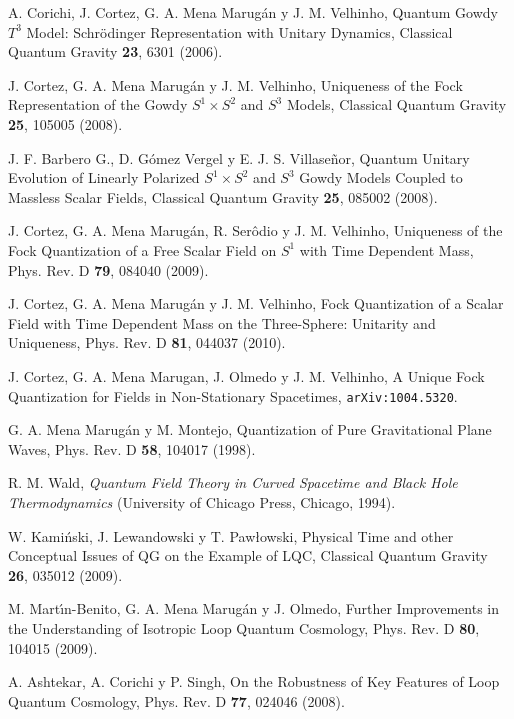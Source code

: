 \begin{thebibliography}{999}
 A. Corichi, J. Cortez, G. A. Mena Marug\'{a}n y J. M. Velhinho, Quantum Gowdy $T^3$
Model: Schr\"odinger Representation with Unitary Dynamics, Classical Quantum Gravity {\bf23}, 6301
(2006).

 J. Cortez, G. A. Mena Marugán y J. M. Velhinho,
Uniqueness of the Fock Representation of the Gowdy $S^1\times S^2$ and $S^3$ Models,
Classical Quantum Gravity {\bf25}, 105005 (2008).

 J. F. Barbero G., D. Gómez Vergel y E. J. S. Villaseñor, Quantum Unitary Evolution
of Linearly Polarized $S^1\times S^2$ and $S^3$ Gowdy Models Coupled to Massless Scalar Fields,
Classical Quantum Gravity {\bf25}, 085002 (2008).

 J. Cortez, G. A. Mena Marugán, R. Serôdio y J. M. Velhinho,
Uniqueness of the Fock Quantization of a Free Scalar Field on $S^1$ with Time Dependent Mass,
Phys. Rev. D {\bf79}, 084040 (2009).

 J. Cortez, G. A. Mena Marugán y J. M. Velhinho,
Fock Quantization of a Scalar Field with Time Dependent Mass on the Three-Sphere: Unitarity and
Uniqueness, Phys. Rev. D {\bf81}, 044037 (2010).

 J. Cortez, G. A. Mena Marugan, J. Olmedo y J. M. Velhinho,
A Unique Fock Quantization for Fields in Non-Stationary Spacetimes, \texttt{arXiv:1004.5320}.


 G. A. Mena Marug\'{a}n y M. Montejo, Quantization of Pure Gravitational Plane
Waves, Phys. Rev. D {\bf58}, 104017 (1998).

 R. M. Wald, {\it Quantum Field Theory in Curved Spacetime and Black Hole
Thermodynamics} (University of Chicago Press, Chicago, 1994). 


 W. Kami\'nski, J. Lewandowski y T. Paw{\l}owski, Physical Time and other Conceptual
Issues of QG on the Example of LQC, Classical Quantum Gravity {\bf 26},
035012 (2009).


 M. Mart\'{\i}n-Benito, G. A. Mena Marug\'{a}n y J. Olmedo, 
Further Improvements in the Understanding of Isotropic Loop Quantum Cosmology, Phys. Rev. D {\bf
80}, 104015 (2009).

A. Ashtekar, A. Corichi y P. Singh, On the Robustness of Key Features of Loop
Quantum Cosmology, Phys. Rev. D {\bf 77}, 024046 (2008).


\end{thebibliography}
